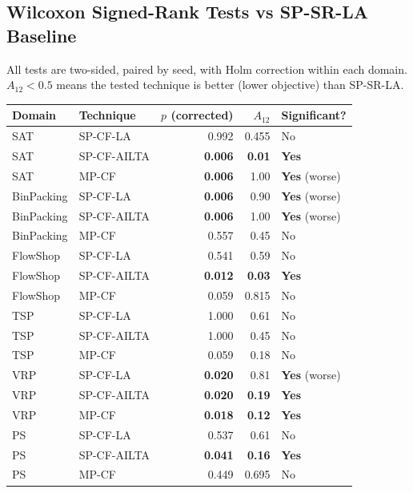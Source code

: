 \documentclass[11pt,a4paper]{article}
\begin{document}
\subsection{Wilcoxon Signed-Rank Tests vs SP-SR-LA Baseline}

All tests are two-sided, paired by seed, with Holm correction within each domain.
$A_{12} < 0.5$ means the tested technique is better (lower objective) than SP-SR-LA.

\begin{table}[H]
\centering
\small
\begin{tabular}{llrrl}
\toprule
Domain & Technique & $p$ (corrected) & $A_{12}$ & Significant? \\
\midrule
SAT & SP-CF-LA & 0.992 & 0.455 & No \\
SAT & SP-CF-AILTA & \textbf{0.006} & \textbf{0.01} & \textbf{Yes} \\
SAT & MP-CF & \textbf{0.006} & 1.00 & \textbf{Yes} (worse) \\
\midrule
BinPacking & SP-CF-LA & \textbf{0.006} & 0.90 & \textbf{Yes} (worse) \\
BinPacking & SP-CF-AILTA & \textbf{0.006} & 1.00 & \textbf{Yes} (worse) \\
BinPacking & MP-CF & 0.557 & 0.45 & No \\
\midrule
FlowShop & SP-CF-LA & 0.541 & 0.59 & No \\
FlowShop & SP-CF-AILTA & \textbf{0.012} & \textbf{0.03} & \textbf{Yes} \\
FlowShop & MP-CF & 0.059 & 0.815 & No \\
\midrule
TSP & SP-CF-LA & 1.000 & 0.61 & No \\
TSP & SP-CF-AILTA & 1.000 & 0.45 & No \\
TSP & MP-CF & 0.059 & 0.18 & No \\
\midrule
VRP & SP-CF-LA & \textbf{0.020} & 0.81 & \textbf{Yes} (worse) \\
VRP & SP-CF-AILTA & \textbf{0.020} & \textbf{0.19} & \textbf{Yes} \\
VRP & MP-CF & \textbf{0.018} & \textbf{0.12} & \textbf{Yes} \\
\midrule
PS & SP-CF-LA & 0.537 & 0.61 & No \\
PS & SP-CF-AILTA & \textbf{0.041} & \textbf{0.16} & \textbf{Yes} \\
PS & MP-CF & 0.449 & 0.695 & No \\
\bottomrule
\end{tabular}
\end{table}
\end{document}
